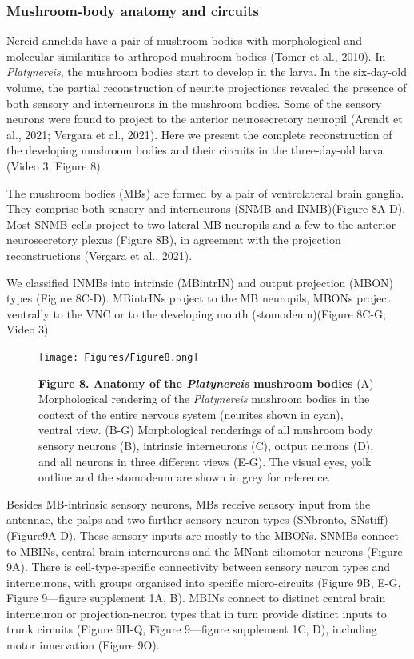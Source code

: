 \documentclass[
  11pt,
]{article}
\begin{document}
\subsubsection{Mushroom-body anatomy and
circuits}\label{mushroom-body-anatomy-and-circuits}

Nereid annelids have a pair of mushroom bodies with morphological and
molecular similarities to arthropod mushroom bodies (Tomer et al.,
2010). In \emph{Platynereis}, the mushroom bodies start to develop in
the larva. In the six-day-old volume, the partial reconstruction of
neurite projectiones revealed the presence of both sensory and
interneurons in the mushroom bodies. Some of the sensory neurons were
found to project to the anterior neurosecretory neuropil (Arendt et al.,
2021; Vergara et al., 2021). Here we present the complete reconstruction
of the developing mushroom bodies and their circuits in the
three-day-old larva (Video 3; Figure 8).

The mushroom bodies (MBs) are formed by a pair of ventrolateral brain
ganglia. They comprise both sensory and interneurons (SNMB and
INMB)(Figure 8A-D). Most SNMB cells project to two lateral MB neuropils
and a few to the anterior neurosecretory plexus (Figure 8B), in
agreement with the projection reconstructions (Vergara et al., 2021).

We classified INMBs into intrinsic (MBintrIN) and output projection
(MBON) types (Figure 8C-D). MBintrINs project to the MB neuropils, MBONs
project ventrally to the VNC or to the developing mouth
(stomodeum)(Figure 8C-G; Video 3).

\begin{figure}[H]

{\centering \texttt{[image: Figures/Figure8.png]}

}

\caption{\textbf{Figure 8. Anatomy of the \emph{Platynereis} mushroom
bodies} (A) Morphological rendering of the \emph{Platynereis} mushroom
bodies in the context of the entire nervous system (neurites shown in
cyan), ventral view. (B-G) Morphological renderings of all mushroom body
sensory neurons (B), intrinsic interneurons (C), output neurons (D), and
all neurons in three different views (E-G). The visual eyes, yolk
outline and the stomodeum are shown in grey for reference.}

\end{figure}%

Besides MB-intrinsic sensory neurons, MBs receive sensory input from the
antennae, the palps and two further sensory neuron types (SNbronto,
SNstiff)(Figure9A-D). These sensory inputs are mostly to the MBONs.
SNMBs connect to MBINs, central brain interneurons and the MNant
ciliomotor neurons (Figure 9A). There is cell-type-specific connectivity
between sensory neuron types and interneurons, with groups organised
into specific micro-circuits (Figure 9B, E-G, Figure 9---figure
supplement 1A, B). MBINs connect to distinct central brain interneuron
or projection-neuron types that in turn provide distinct inputs to trunk
circuits (Figure 9H-Q, Figure 9---figure supplement 1C, D), including
motor innervation (Figure 9O).
\end{document}
